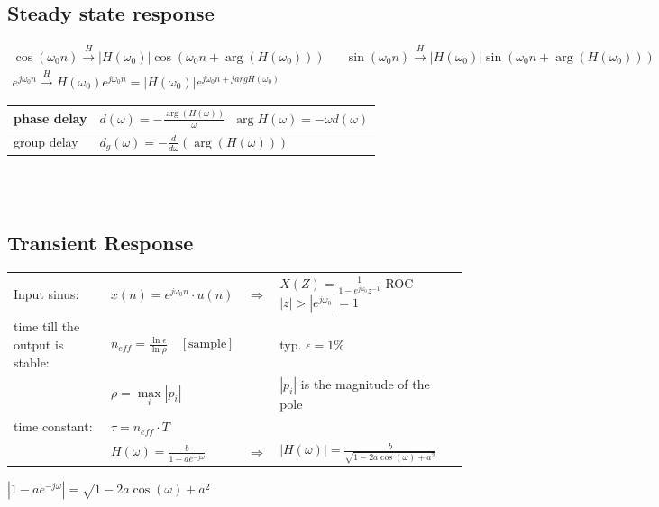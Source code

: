 \subsection{Steady state response}
\begin{align*}
  \cos(\omega_0 n) \xrightarrow{H} \left|H(\omega_0) \right| \cos(\omega_0 n + \arg(H(\omega_0))) &&
  \sin(\omega_0 n) \xrightarrow{H} \left|H(\omega_0) \right| \sin(\omega_0 n + \arg(H(\omega_0))) \\
  e^{j\omega_0 n} \xrightarrow{H} H(\omega_0)e^{j\omega_0 n} = |H(\omega_0)| e^{j\omega_0 n + j argH(\omega_0)}
\end{align*}


\begin{tabularx}{0.6\textwidth}{|l|X|}
	\hline
	phase delay & $d(\omega) = - \frac{\arg(H(\omega))}{\omega}$\ \qquad $\arg H(\omega) = -\omega d(\omega)$
	\\ \hline 
	group delay & $d_g(\omega) = -\frac{d}{d\omega}(\arg(H(\omega)))$	
	\\ \hline
\end{tabularx}\\ \\

\subsection{Transient Response}
\begin{tabular}{llll}
  Input sinus: &
  $x(n) = e^{j \omega_0 n} \cdot u(n)$ &
  $\Rightarrow$ &
  $X(Z) = \frac{1}{1-e^{j \omega_0} z^{-1}}$ \qquad
  ROC $|z| > |e^{j\omega_0}|=1$ \\
  
  time till the output is stable: &
  $n_{eff} = \frac{\ln \epsilon}{\ln \rho} \quad [\text{sample}]$ &
  &
  typ. $\epsilon = 1\%$ \\
 
  &
  $\rho = \max\limits_{i}\left|p_i \right| $ &
  &
  $|p_i|$ is the magnitude of the pole\\
  
  time constant: &
  $\tau = n_{eff}\cdot T$ \\
  
  &
  $H(\omega)=\frac{b}{1-ae^{-j\omega}}$ &
  $\Rightarrow$ &
  $\left| H(\omega)\right| = \frac{b}{\sqrt{1-2a\cos(\omega) + a^2}}$ \\
\end{tabular}

$\left| 1-a e^{-j\omega}\right| = \sqrt{1-2a\cos(\omega) + a^2}$\\

